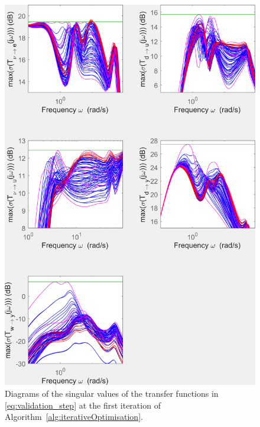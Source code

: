 \begin{figure}[ht!]
    \centering
    \includegraphics[trim=0cm 0cm 0cm 0cm,clip,width=0.9\columnwidth]{figures/transferts_tcst.png}
    \caption{Diagrams of the singular values of the transfer functions in \eqref{eq:validation_step} at the first iteration of Algorithm~\ref{alg:iterativeOptimisation}.}
    \label{fig:transferts_tcst}
\end{figure}


